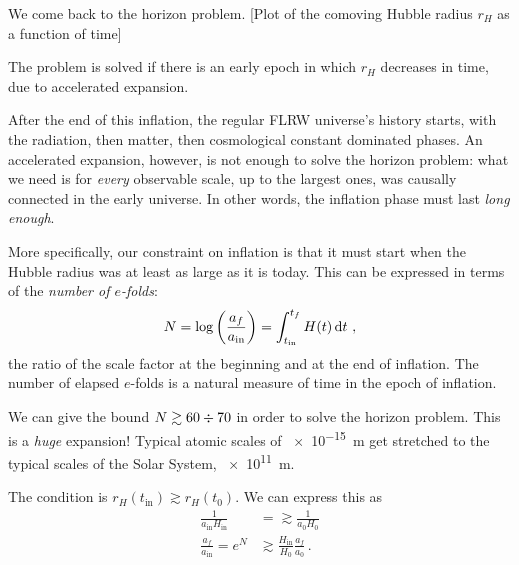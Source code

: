 \documentclass[main.tex]{subfiles}
\begin{document}

We come back to the horizon problem. 
[Plot of the comoving Hubble radius \(r_H\) as a function of time]

The problem is solved if there is an early epoch in which \(r_H\) decreases in time, due to accelerated expansion.

After the end of this inflation, the regular FLRW universe's history starts, with the radiation, then matter, then cosmological constant dominated phases. 
An accelerated expansion, however, is not enough to solve the horizon problem: what we need is for \emph{every} observable scale, up to the largest ones, was causally connected in the early universe.
In other words, the inflation phase must last \emph{long enough}.

More specifically, our constraint on inflation is that it must start when the Hubble radius was at least as large as it is today.
This can be expressed in terms of the \emph{number of \(e\)-folds}: 
%
\begin{align}
N = \log \qty( \frac{a_f}{a _{\text{in}}})
= \int_{t _{\text{in}}}^{t_f} H(t) \dd{t}
\,,
\end{align}
%
the ratio of the scale factor at the beginning and at the end of inflation.
The number of elapsed \(e\)-folds is a natural measure of time in the epoch of inflation. 

We can give the bound \(N \gtrsim 60 \divisionsymbol 70\) in order to solve the horizon problem. 
This is a \emph{huge} expansion! Typical atomic scales of \SI{e-15}{m} get stretched to the typical scales of the Solar System, \SI{e11}{m}. 

The condition is \(r_H (t _{\text{in}}) \gtrsim r_H (t_0 )\). 
We can express this as 
%
\begin{align}
\frac{1}{a _{\text{in}} H _{\text{in}}} &=\gtrsim \frac{1}{a_0 H_0 }  \\
\frac{a_f}{ a _{\text{in}}} = e^{N} &\gtrsim \frac{H _{\text{in}}}{H_0 } \frac{a_f}{a_0}
\,.
\end{align}
%
\end{document}
